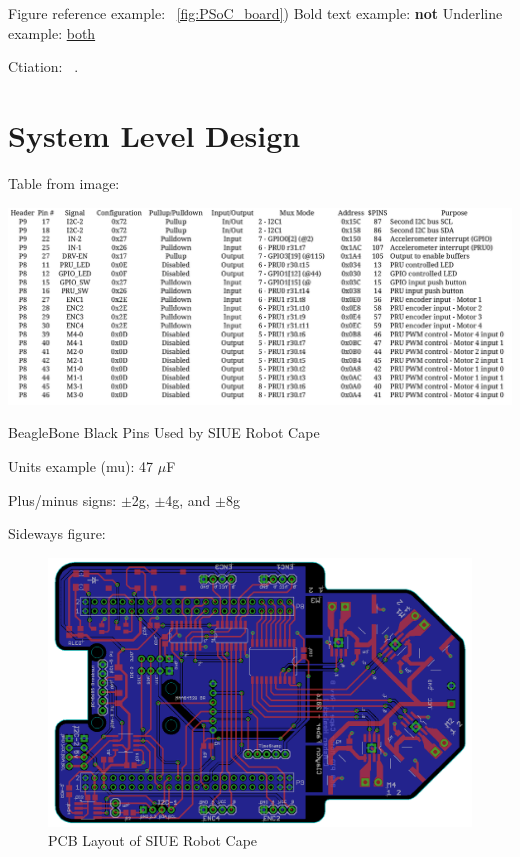 \documentclass[12pt,oneside,final]{siuethesis}
\theoremstyle{definition}
\begin{document}
Figure reference example: ~\ref{fig:PSoC_board}) Bold text example: \textbf{not} Underline example: \underline{both} 

Ctiation: ~\cite{DMCC}. 



\chapter{System Level Design}


%


Table from image: 

\begin{table}[htbp!]
 \centering
 \includegraphics[scale=.3,keepaspectratio=true]{./images/Pinlist.png}
 \caption{BeagleBone Black Pins Used by SIUE Robot Cape}
 \label{tab:Pin_list}
\end{table}

Units example (mu): 47 $\mu$F

Plus/minus signs: $\pm$2g, $\pm$4g, and $\pm$8g 

Sideways figure:

\begin{figure}
 \centering
 \includegraphics[scale=.5,keepaspectratio=true]{./images/layout.PNG}
 \caption{PCB Layout of SIUE Robot Cape}
 \label{fig:Layout}
\end{figure}
\end{document}
